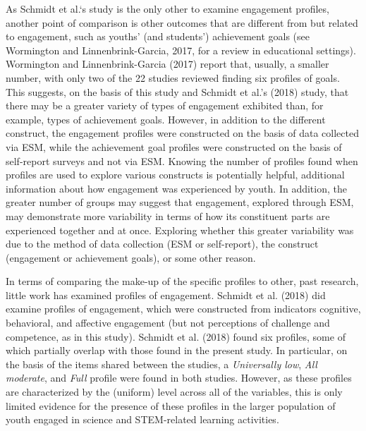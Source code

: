 \documentclass[]{book}
\theoremstyle{definition}
\theoremstyle{definition}
\theoremstyle{definition}
\theoremstyle{remark}
\begin{document}
As Schmidt et al.`s study is the only other to examine engagement
profiles, another point of comparison is other outcomes that are
different from but related to engagement, such as youths' (and
students') achievement goals (see Wormington and Linnenbrink-Garcia,
2017, for a review in educational settings). Wormington and
Linnenbrink-Garcia (2017) report that, usually, a smaller number, with
only two of the 22 studies reviewed finding six profiles of goals. This
suggests, on the basis of this study and Schmidt et al.'s (2018) study,
that there may be a greater variety of types of engagement exhibited
than, for example, types of achievement goals. However, in addition to
the different construct, the engagement profiles were constructed on the
basis of data collected via ESM, while the achievement goal profiles
were constructed on the basis of self-report surveys and not via ESM.
Knowing the number of profiles found when profiles are used to explore
various constructs is potentially helpful, additional information about
how engagement was experienced by youth. In addition, the greater number
of groups may suggest that engagement, explored through ESM, may
demonstrate more variability in terms of how its constituent parts are
experienced together and at once. Exploring whether this greater
variability was due to the method of data collection (ESM or
self-report), the construct (engagement or achievement goals), or some
other reason.

In terms of comparing the make-up of the specific profiles to other,
past research, little work has examined profiles of engagement. Schmidt
et al. (2018) did examine profiles of engagement, which were constructed
from indicators cognitive, behavioral, and affective engagement (but not
perceptions of challenge and competence, as in this study). Schmidt et
al. (2018) found six profiles, some of which partially overlap with
those found in the present study. In particular, on the basis of the
items shared between the studies, a \emph{Universally low}, \emph{All
moderate}, and \emph{Full} profile were found in both studies. However,
as these profiles are characterized by the (uniform) level across all of
the variables, this is only limited evidence for the presence of these
profiles in the larger population of youth engaged in science and
STEM-related learning activities.
\end{document}
